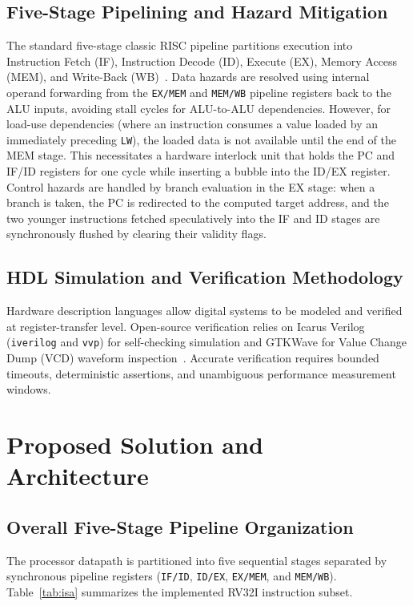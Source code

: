 \documentclass[conference]{IEEEtran}
\begin{document}
\subsection{Five-Stage Pipelining and Hazard Mitigation}
The standard five-stage classic RISC pipeline partitions execution into Instruction Fetch (IF), Instruction Decode (ID), Execute (EX), Memory Access (MEM), and Write-Back (WB)~\cite{b3}. 
Data hazards are resolved using internal operand forwarding from the \texttt{EX/MEM} and \texttt{MEM/WB} pipeline registers back to the ALU inputs, avoiding stall cycles for ALU-to-ALU dependencies. However, for load-use dependencies (where an instruction consumes a value loaded by an immediately preceding \texttt{LW}), the loaded data is not available until the end of the MEM stage. This necessitates a hardware interlock unit that holds the PC and IF/ID registers for one cycle while inserting a bubble into the ID/EX register.
Control hazards are handled by branch evaluation in the EX stage: when a branch is taken, the PC is redirected to the computed target address, and the two younger instructions fetched speculatively into the IF and ID stages are synchronously flushed by clearing their validity flags.

\subsection{HDL Simulation and Verification Methodology}
Hardware description languages allow digital systems to be modeled and verified at register-transfer level. Open-source verification relies on Icarus Verilog (\texttt{iverilog} and \texttt{vvp}) for self-checking simulation and GTKWave for Value Change Dump (VCD) waveform inspection~\cite{b4,b5}. Accurate verification requires bounded timeouts, deterministic assertions, and unambiguous performance measurement windows.

\section{Proposed Solution and Architecture}

\subsection{Overall Five-Stage Pipeline Organization}
The processor datapath is partitioned into five sequential stages separated by synchronous pipeline registers (\texttt{IF/ID}, \texttt{ID/EX}, \texttt{EX/MEM}, and \texttt{MEM/WB}). Table~\ref{tab:isa} summarizes the implemented RV32I instruction subset.
\end{document}

